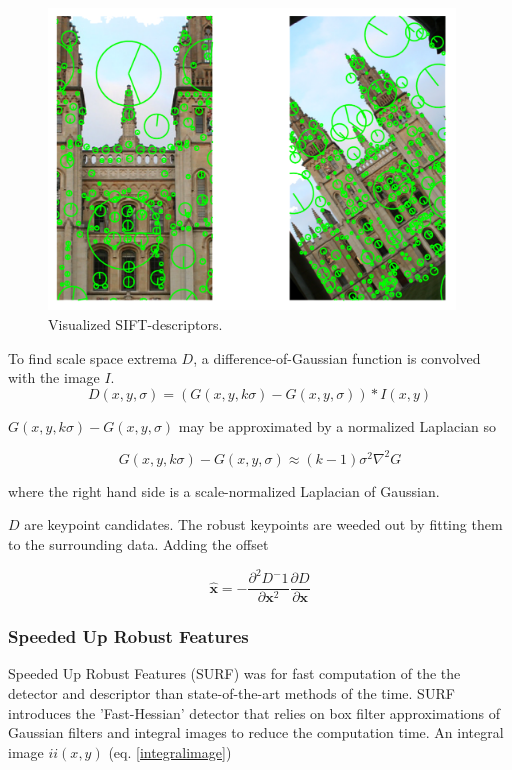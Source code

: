 \documentclass[english,12pt,a4paper,pdftex,elec,utf8]{aaltothesis}
\begin{document}
\begin{figure}[htb]
\begin{center}
\includegraphics[height=8cm]{figures/siftDescriptor}
\end{center}
\caption{Visualized SIFT-descriptors.}
\label{siftfeatures}
\end{figure}

To find scale space extrema $D$, a difference-of-Gaussian function is convolved with the image $I$.
\begin{equation}\label{keypoints}
  D(x,y,\sigma) = (G(x,y,k\sigma) - G(x, y, \sigma))*I(x,y)
\end{equation}\cite{Lowe2004}

$G(x,y,k\sigma) - G(x, y, \sigma)$ may be approximated by a normalized Laplacian so

\begin{equation}\label{approximatedog}
G(x,y,k\sigma) - G(x, y, \sigma) \approx (k - 1)\sigma^{2}\nabla^{2}G
\end{equation}\cite{Lowe2004}

where the right hand side is a scale-normalized Laplacian of Gaussian.

$D$ are keypoint candidates. The robust keypoints are weeded out by fitting them to the surrounding data. \cite{Lowe2004} Adding the offset

\begin{equation}\label{keypointoffset}
\hat{\boldsymbol{x}} = - \frac{\partial^2D^-1}{\partial \boldsymbol{x}^2}\frac{\partial D}{\partial \boldsymbol{x}}
\end{equation}\cite{Lowe2004}

\subsubsection{Speeded Up Robust Features}
Speeded Up Robust Features (SURF) was for fast computation of the the detector and descriptor than state-of-the-art methods of the time. SURF introduces the 'Fast-Hessian' detector that relies on box filter approximations of Gaussian filters and integral images to reduce the computation time. \cite{Bay2006} An integral image $ii(x,y)$ (eq. \ref{integralimage})
\end{document}
